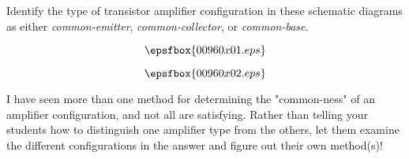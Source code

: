 

Identify the type of transistor amplifier configuration in these schematic diagrams as either {\it common-emitter}, {\it common-collector}, or {\it common-base}.

$$\epsfbox{00960x01.eps}$$







$$\epsfbox{00960x02.eps}$$







I have seen more than one method for determining the "common-ness" of an amplifier configuration, and not all are satisfying.  Rather than telling your students how to distinguish one amplifier type from the others, let them examine the different configurations in the answer and figure out their own method(s)!




